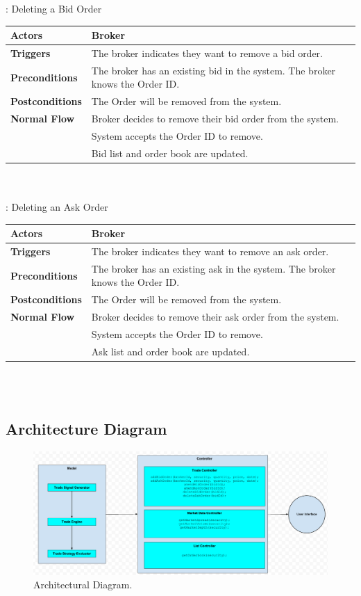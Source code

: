 \documentclass[a4paper]{article}
\begin{document}
: Deleting a Bid Order \\ 
\begin{tabular}{ | l | p{10cm} |}\hline
	{\bf Actors} & Broker \\\hline
	{\bf Triggers} & The broker indicates they want to remove a bid order. \\\hline
	{\bf Preconditions} & The broker has an existing bid in the system. The broker knows the Order ID. \\\hline
	{\bf Postconditions} & The Order will be removed from the system. \\\hline
	{\bf Normal Flow} & Broker decides to remove their bid order from the system. \\
	& System accepts the Order ID to remove. \\
	& Bid list and order book are updated.  \\\hline
\end{tabular} \\\\

: Deleting an Ask Order \\ 
\begin{tabular}{ | l | p{10cm} |}\hline
	{\bf Actors} & Broker \\\hline
	{\bf Triggers} & The broker indicates they want to remove an ask order. \\\hline
	{\bf Preconditions} & The broker has an existing ask in the system. The broker knows the Order ID. \\\hline
	{\bf Postconditions} & The Order will be removed from the system.  \\\hline
	{\bf Normal Flow} & Broker decides to remove their ask order from the system. \\
	& System accepts the Order ID to remove. \\
	& Ask list and order book are updated. \\\hline
\end{tabular} \\\\

\begin {landscape}
\section {Architecture Diagram}
\begin{figure}
  \caption{Architectural Diagram.}
  \centering
    \includegraphics[width=1.6\textwidth]{images/ADiagram}
\end{figure}
\end {landscape}
\end{document}
